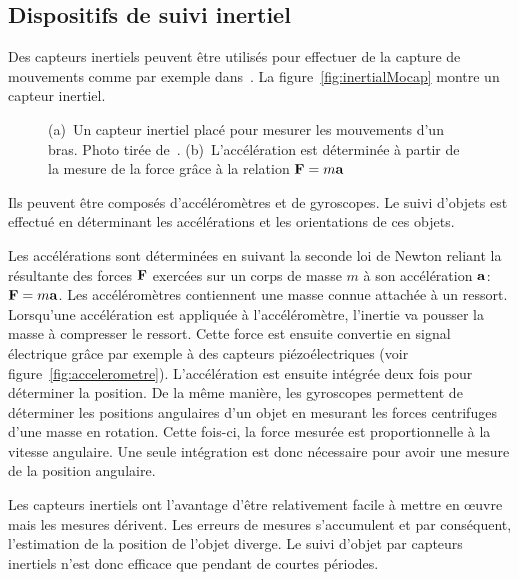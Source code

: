 \subsection{Dispositifs de suivi inertiel}
Des capteurs inertiels peuvent être utilisés pour effectuer de la 
capture de mouvements comme par exemple dans~\cite{liu11}.
La figure~\ref{fig:inertialMocap} montre un capteur inertiel.
\begin{figure}[t]
  \begin{center}
    \subfigure[]{
    \resizebox{.4\textwidth}{!} {
      
    }
  \label{fig:accelerometre}
    }
  \end{center}
  \caption[Capteurs inertiels.]{(a)~Un capteur inertiel placé pour mesurer les mouvements d'un bras. Photo tirée de~\cite{vanacht07}. 
  (b)~L'accélération est déterminée à partir de la mesure de la force gr\^ace à la relation ${\mathbf{F}} = m{\mathbf{a}}$}
\end{figure}
Ils peuvent être composés d'accéléromètres
et de gyroscopes. Le suivi d'objets est effectué 
en déterminant les accélérations et les orientations de ces objets. 

Les accélérations sont déterminées en suivant la seconde loi de Newton reliant
la résultante des forces ${\mathbf{F}}$ exercées sur un corps de masse $m$ à son accélération ${\mathbf{a}}$:
${\mathbf{F}} = m {\mathbf{a}}$. Les accéléromètres contiennent une masse connue attachée à un ressort.
Lorsqu'une accélération est appliquée à l'accéléromètre, l'inertie va pousser la masse 
à compresser le ressort. Cette force est ensuite convertie en signal électrique
gr\^ace par exemple à des capteurs piézoélectriques (voir figure~\ref{fig:accelerometre}).
L'accélération est ensuite intégrée deux fois pour déterminer la position.
De la même manière, les gyroscopes permettent de déterminer les positions angulaires
d'un objet en mesurant les forces centrifuges d'une masse en rotation. Cette fois-ci,
la force mesurée est proportionnelle à la vitesse angulaire. Une seule intégration
est donc nécessaire pour avoir une mesure de la position angulaire.

Les capteurs inertiels ont l'avantage d'être relativement facile à
mettre en \oe uvre mais les mesures dérivent.
Les erreurs de mesures s'accumulent et par conséquent, 
l'estimation de la position de l'objet diverge.
Le suivi d'objet par capteurs inertiels n'est donc efficace que 
pendant de courtes périodes.

